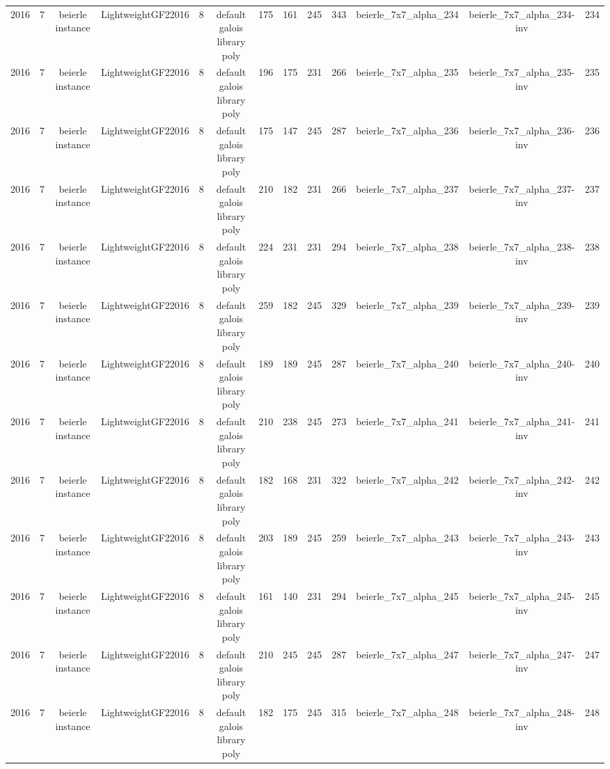 \begin{tabular}{c c c c c c c c c c c c c}
2016 & 7 & beierle instance & LightweightGF22016 & 8 & default galois library poly & 175 & 161 & 245 & 343 & beierle_7x7_alpha_234 & beierle_7x7_alpha_234-inv & 234 \\
2016 & 7 & beierle instance & LightweightGF22016 & 8 & default galois library poly & 196 & 175 & 231 & 266 & beierle_7x7_alpha_235 & beierle_7x7_alpha_235-inv & 235 \\
2016 & 7 & beierle instance & LightweightGF22016 & 8 & default galois library poly & 175 & 147 & 245 & 287 & beierle_7x7_alpha_236 & beierle_7x7_alpha_236-inv & 236 \\
2016 & 7 & beierle instance & LightweightGF22016 & 8 & default galois library poly & 210 & 182 & 231 & 266 & beierle_7x7_alpha_237 & beierle_7x7_alpha_237-inv & 237 \\
2016 & 7 & beierle instance & LightweightGF22016 & 8 & default galois library poly & 224 & 231 & 231 & 294 & beierle_7x7_alpha_238 & beierle_7x7_alpha_238-inv & 238 \\
2016 & 7 & beierle instance & LightweightGF22016 & 8 & default galois library poly & 259 & 182 & 245 & 329 & beierle_7x7_alpha_239 & beierle_7x7_alpha_239-inv & 239 \\
2016 & 7 & beierle instance & LightweightGF22016 & 8 & default galois library poly & 189 & 189 & 245 & 287 & beierle_7x7_alpha_240 & beierle_7x7_alpha_240-inv & 240 \\
2016 & 7 & beierle instance & LightweightGF22016 & 8 & default galois library poly & 210 & 238 & 245 & 273 & beierle_7x7_alpha_241 & beierle_7x7_alpha_241-inv & 241 \\
2016 & 7 & beierle instance & LightweightGF22016 & 8 & default galois library poly & 182 & 168 & 231 & 322 & beierle_7x7_alpha_242 & beierle_7x7_alpha_242-inv & 242 \\
2016 & 7 & beierle instance & LightweightGF22016 & 8 & default galois library poly & 203 & 189 & 245 & 259 & beierle_7x7_alpha_243 & beierle_7x7_alpha_243-inv & 243 \\
2016 & 7 & beierle instance & LightweightGF22016 & 8 & default galois library poly & 161 & 140 & 231 & 294 & beierle_7x7_alpha_245 & beierle_7x7_alpha_245-inv & 245 \\
2016 & 7 & beierle instance & LightweightGF22016 & 8 & default galois library poly & 210 & 245 & 245 & 287 & beierle_7x7_alpha_247 & beierle_7x7_alpha_247-inv & 247 \\
2016 & 7 & beierle instance & LightweightGF22016 & 8 & default galois library poly & 182 & 175 & 245 & 315 & beierle_7x7_alpha_248 & beierle_7x7_alpha_248-inv & 248 \\

\end{tabular}
